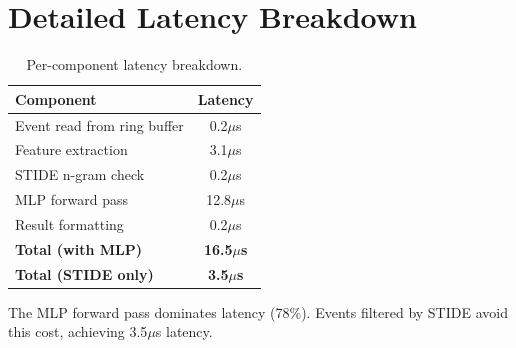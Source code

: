\section{Detailed Latency Breakdown}
\label{app:latency}

\begin{table}[h]
\centering
\caption{Per-component latency breakdown.}
\label{tab:latency-breakdown}
\begin{tabular}{lc}
\toprule
\textbf{Component} & \textbf{Latency} \\
\midrule
Event read from ring buffer & 0.2$\mu$s \\
Feature extraction & 3.1$\mu$s \\
STIDE n-gram check & 0.2$\mu$s \\
MLP forward pass & 12.8$\mu$s \\
Result formatting & 0.2$\mu$s \\
\midrule
\textbf{Total (with MLP)} & \textbf{16.5$\mu$s} \\
\textbf{Total (STIDE only)} & \textbf{3.5$\mu$s} \\
\bottomrule
\end{tabular}
\end{table}

The MLP forward pass dominates latency (78\%).
Events filtered by STIDE avoid this cost, achieving 3.5$\mu$s latency.
